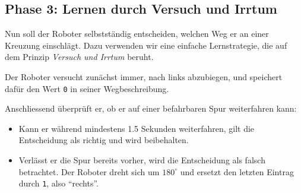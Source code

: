 








\subsection{Phase 3: Lernen durch Versuch und Irrtum}

Nun soll der Roboter selbstständig entscheiden,
welchen Weg er an einer Kreuzung einschlägt.
Dazu verwenden wir eine einfache Lernstrategie,
die auf dem Prinzip \emph{Versuch und Irrtum}
beruht.

Der Roboter versucht zunächst immer, nach links
abzubiegen, und speichert dafür den Wert \texttt{0}
in seiner Wegbeschreibung.

Anschliessend überprüft er, ob er auf einer
befahrbaren Spur weiterfahren kann:
\begin{itemize}
    \item Kann er während mindestens 1.5 Sekunden
          weiterfahren, gilt die Entscheidung als
          richtig und wird beibehalten.
    \item Verlässt er die Spur bereits vorher,
          wird die Entscheidung als falsch betrachtet.
          Der Roboter dreht sich um \(180^\circ\)
          und ersetzt den letzten Eintrag durch
          \texttt{1}, also \enquote{rechts}.
\end{itemize}

